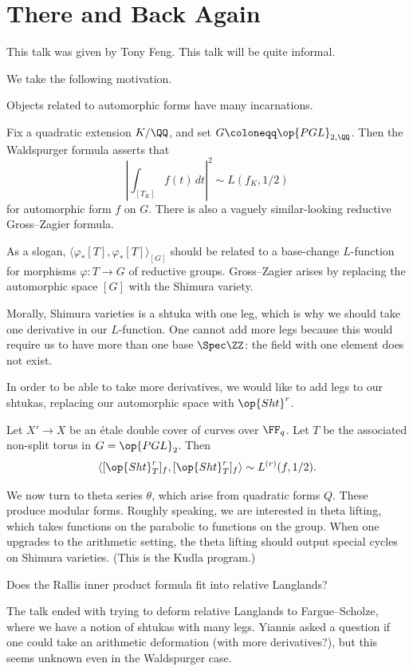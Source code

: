 \documentclass{article}
\begin{document}
\section{There and Back Again}
This talk was given by Tony Feng. This talk will be quite informal.

We take the following motivation.
\begin{idea}
	Objects related to automorphic forms have many incarnations.
\end{idea}
\begin{example}
	Fix a quadratic extension $K/\QQ$, and set $G\coloneqq\op{PGL}_{2,\QQ}$. Then the Waldspurger formula asserts that
	\[\left|\int_{[T_K]}f(t)\,dt\right|^2\sim L(f_K,1/2)\]
	for automorphic form $f$ on $G$. There is also a vaguely similar-looking reductive Gross--Zagier formula.
\end{example}
\begin{remark}
	As a slogan, $\langle\varphi_*[T],\varphi_*[T]\rangle_{[G]}$ should be related to a base-change $L$-function for morphisms $\varphi\colon T\to G$ of reductive groups. Gross--Zagier arises by replacing the automorphic space $[G]$ with the Shimura variety.
\end{remark}
\begin{remark}
	Morally, Shimura varieties is a shtuka with one leg, which is why we should take one derivative in our $L$-function. One cannot add more legs because this would require us to have more than one base $\Spec\ZZ$: the field with one element does not exist.
\end{remark}
In order to be able to take more derivatives, we would like to add legs to our shtukas, replacing our automorphic space with $\op{Sht}^r$.
\begin{theorem}
	Let $X'\to X$ be an \'etale double cover of curves over $\FF_q$. Let $T$ be the associated non-split torus in $G=\op{PGL}_2$. Then
	\[\left\langle[\op{Sht}^r_T]_f,[\op{Sht}^r_T]_f\right\rangle\sim L^{(r)}(f,1/2).\]
\end{theorem}
We now turn to theta series $\theta$, which arise from quadratic forms $Q$. These produce modular forms. Roughly speaking, we are interested in theta lifting, which takes functions on the parabolic to functions on the group. When one upgrades to the arithmetic setting, the theta lifting should output special cycles on Shimura varieties. (This is the Kudla program.)
\begin{idea}
	Does the Rallis inner product formula fit into relative Langlands?
\end{idea}
The talk ended with trying to deform relative Langlands to Fargue--Scholze, where we have a notion of shtukas with many legs. Yiannis asked a question if one could take an arithmetic deformation (with more derivatives?), but this seems unknown even in the Waldspurger case.
\end{document}
